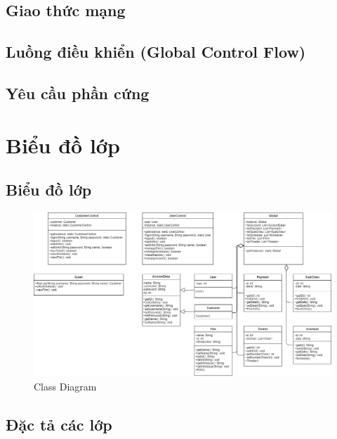 \documentclass[a4paper, 12pt]{article}
\begin{document}
\subsection{Giao thức mạng}

\subsection{Luồng điều khiển (Global Control Flow)}

\subsection{Yêu cầu phần cứng}

\clearpage

\section{Biểu đồ lớp}

\subsection{Biểu đồ lớp}
\begin{figure}[H]
	\begin{center}
		\includegraphics[scale=0.37]{image/5.0.png}
		\caption{Class Diagram}
	\end{center}
\end{figure}

\subsection{Đặc tả các lớp}
\end{document}

